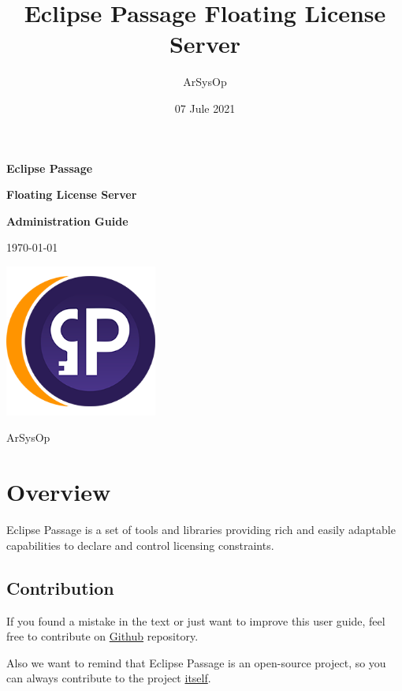 \documentclass[12pt]{report}
\title{Eclipse Passage Floating License Server}
\author{ArSysOp}
\date{07 Jule 2021}
\begin{document}
\begin{titlepage}
    \begin{center}
        \vspace*{1cm}

        \Huge \textbf{Eclipse Passage}
        
        \Huge \textbf{Floating License Server}
        
        \Huge \textbf{Administration Guide}

        \vspace{0.5cm}

        \Large \today

        \vfill

        \includegraphics[width=5cm]{passage}

        \vfill

        \Large ArSysOp
    \end{center}
\end{titlepage}

\tableofcontents
{}

\chapter*{Overview}
Eclipse Passage is a set of tools and libraries providing rich and easily adaptable capabilities 
to declare and control licensing constraints.

\section*{Contribution}
If you found a mistake in the text or just want to improve this user guide, feel free to contribute on \href{https://github.com/eclipse-passage/passage-docs}{Github} repository.

Also we want to remind that Eclipse Passage is an open-source project, so you can always contribute to the project \href{https://github.com/eclipse-passage/passage}{itself}.
\end{document}
